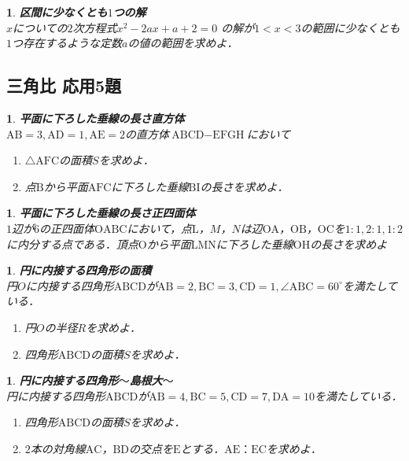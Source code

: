 \documentclass[10pt,
fleqn,
dvipdfmx,
uplatex
]{jsarticle}
\newtheorem{question}[Question]{}
\begin{document}
\begin{question}{\bf\boldmath 区間に少なくとも$1$つの解}\\
$x$についての$2$次方程式$x^2-2ax+a+2=0$
の解が$1<x<3$の範囲に少なくとも$1$つ存在するような定数$a$の値の範囲を求めよ．
\end{question}

\subsection{三角比 応用5題}



\begin{question}{\bf\boldmath 平面に下ろした垂線の長さ直方体}\\
$\text{AB}=3, \text{AD}=1, \text{AE}=2$の直方体$\text{ABCD}-\text{EFGH}$において
\begin{enumerate}
\item $\triangle \text{AFC}$の面積$S$を求めよ．
\item 点$\text{B}$から平面$\text{AFC}$に下ろした垂線$\text{BI}$の長さを求めよ．
\end{enumerate}

\end{question}



\begin{question}{\bf\boldmath 平面に下ろした垂線の長さ正四面体}\\
$1$辺が$6$の正四面体$\text{OABC}$において，点$\text{L}$，$M$，$N$は辺$\text{OA}$，$\text{OB}$，$\text{OC}$を$1:1, 2:1, 1:2$に内分する点である．頂点$\text{O}$から平面$\text{LMN}$に下ろした垂線$\text{OH}$の長さを求めよ
\end{question}



\begin{question}{\bf\boldmath 円に内接する四角形の面積}\\
円$O$に内接する四角形$\text{ABCD}$が$\text{AB}=2, \text{BC}=3, \text{CD}=1, \angle \text{ABC}={60}^\circ$を満たしている．
\begin{enumerate}
\item 円$O$の半径$R$を求めよ．
\item 四角形$\text{ABCD}$の面積$S$を求めよ．
\end{enumerate}

\end{question}



\begin{question}{\bf\boldmath 円に内接する四角形$〜$島根大$〜$}\\
円に内接する四角形$\text{ABCD}$が$\text{AB}=4, \text{BC}=5, \text{CD}=7, \text{DA}={10}$を満たしている．
\begin{enumerate}
\item 四角形$\text{ABCD}$の面積$S$を求めよ．
\item $2$本の対角線$\text{AC}$，$\text{BD}$の交点を$\text{E}$とする．$\text{AE}：\text{EC}$を求めよ．
\end{enumerate}

\end{question}
\end{document}
